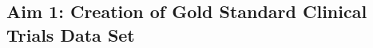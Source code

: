 \documentclass[../main.tex]{subfiles}
\begin{document}
\subsection{Aim 1: Creation of Gold Standard Clinical Trials Data Set}

\subsubsection{}

\subsubsection{}
\end{document}
